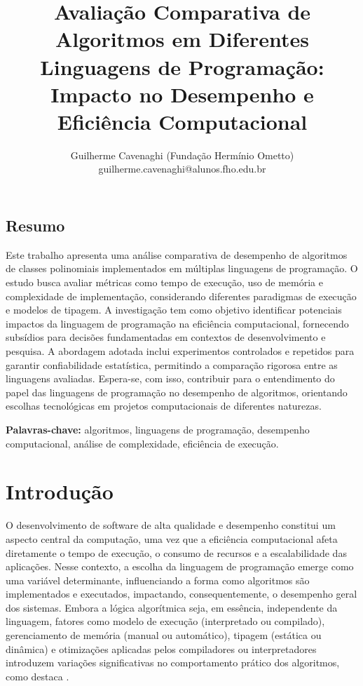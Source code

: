 \documentclass[12pt, a4paper]{article}
\title{Avaliação Comparativa de Algoritmos em Diferentes Linguagens de Programação: Impacto no Desempenho e Eficiência Computacional}
\author{Guilherme Cavenaghi (Fundação Hermínio Ometto) guilherme.cavenaghi@alunos.fho.edu.br}
\date{}
\begin{document}

\maketitle

\begin{flushleft}
\section*{Resumo}
\noindent Este trabalho apresenta uma análise comparativa de desempenho de algoritmos de classes polinomiais implementados em múltiplas linguagens de programação. O estudo busca avaliar métricas como tempo de execução, uso de memória e complexidade de implementação, considerando diferentes paradigmas de execução e modelos de tipagem. A investigação tem como objetivo identificar potenciais impactos da linguagem de programação na eficiência computacional, fornecendo subsídios para decisões fundamentadas em contextos de desenvolvimento e pesquisa. A abordagem adotada inclui experimentos controlados e repetidos para garantir confiabilidade estatística, permitindo a comparação rigorosa entre as linguagens avaliadas. Espera-se, com isso, contribuir para o entendimento do papel das linguagens de programação no desempenho de algoritmos, orientando escolhas tecnológicas em projetos computacionais de diferentes naturezas.

\vspace{0.15cm}
\noindent\textbf{Palavras-chave:} algoritmos, linguagens de programação, desempenho computacional, análise de complexidade, eficiência de execução.
\end{flushleft}


\section{Introdução}
O desenvolvimento de software de alta qualidade e desempenho constitui um aspecto central da computação, uma vez que a eficiência computacional afeta diretamente o tempo de execução, o consumo de recursos e a escalabilidade das aplicações. Nesse contexto, a escolha da linguagem de programação emerge como uma variável determinante, influenciando a forma como algoritmos são implementados e executados, impactando, consequentemente, o desempenho geral dos sistemas. Embora a lógica algorítmica seja, em essência, independente da linguagem, fatores como modelo de execução (interpretado ou compilado), gerenciamento de memória (manual ou automático), tipagem (estática ou dinâmica) e otimizações aplicadas pelos compiladores ou interpretadores introduzem variações significativas no comportamento prático dos algoritmos, como destaca .
\end{document}
